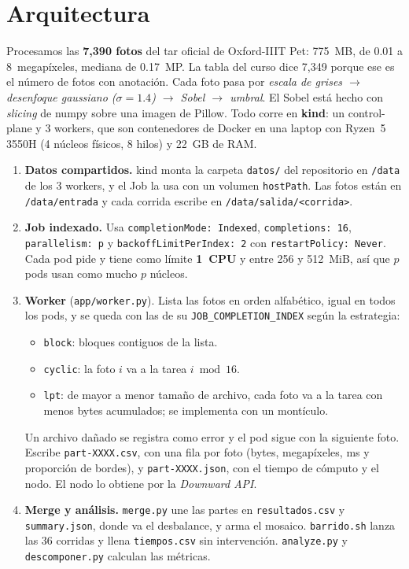 \documentclass[11pt,a4paper]{article}
\begin{document}
\section{Arquitectura}

Procesamos las \textbf{7,390 fotos} del tar oficial de Oxford-IIIT Pet: 775~MB, de 0.01 a 8~megapíxeles, mediana de 0.17~MP. La tabla del curso dice 7,349 porque ese es el número de fotos con anotación. Cada foto pasa por \emph{escala de grises $\rightarrow$ desenfoque gaussiano ($\sigma = 1.4$) $\rightarrow$ Sobel $\rightarrow$ umbral}. El Sobel está hecho con \emph{slicing} de numpy sobre una imagen de Pillow. Todo corre en \textbf{kind}: un control-plane y 3 workers, que son contenedores de Docker en una laptop con Ryzen~5 3550H (4 núcleos físicos, 8 hilos) y 22~GB de RAM.

\begin{enumerate}
\item \textbf{Datos compartidos.} kind monta la carpeta \texttt{datos/} del repositorio en \texttt{/data} de los 3 workers, y el Job la usa con un volumen \texttt{hostPath}. Las fotos están en \texttt{/data/entrada} y cada corrida escribe en \texttt{/data/salida/<corrida>}.
\item \textbf{Job indexado.} Usa \texttt{completionMode:~Indexed}, \texttt{completions:~16}, \texttt{parallelism:~p} y
 \texttt{backoffLimitPerIndex: 2} con \texttt{restartPolicy: Never}. Cada pod pide y tiene como límite \textbf{1~CPU} y entre 256 y 512~MiB, así que $p$ pods usan como mucho $p$ núcleos.
\item \textbf{Worker} (\texttt{app/worker.py}). Lista las fotos en orden alfabético, igual en todos los pods, y se queda con las de su \texttt{JOB\_COMPLETION\_INDEX} según la estrategia:
  \begin{itemize}
  \item \texttt{block}: bloques contiguos de la lista.
  \item \texttt{cyclic}: la foto $i$ va a la tarea $i \bmod 16$.
  \item \texttt{lpt}: de mayor a menor tamaño de archivo, cada foto va a la tarea con menos bytes acumulados; se implementa con un montículo.
  \end{itemize}
  Un archivo dañado se registra como error y el pod sigue con la siguiente foto. Escribe \texttt{part-XXXX.csv}, con una fila por foto (bytes, megapíxeles, ms y proporción de bordes), y \texttt{part-XXXX.json}, con el tiempo de cómputo y el nodo. El nodo lo obtiene por la \emph{Downward API}.
\item \textbf{Merge y análisis.} \texttt{merge.py} une las partes en \texttt{resultados.csv} y \texttt{summary.json}, donde va el desbalance, y arma el mosaico. \texttt{barrido.sh} lanza las 36 corridas y llena \texttt{tiempos.csv} sin intervención. \texttt{analyze.py} y \texttt{descomponer.py} calculan las métricas.
\end{enumerate}
\end{document}
